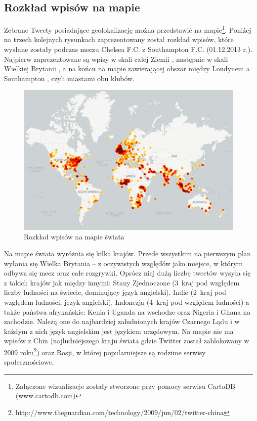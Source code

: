 

\clearpage
\subsection{Rozkład wpisów na mapie}
\label{subsection:rozkladnamapie}
Zebrane Tweety posiadające geolokalizację można przedstawić na
mapie\footnote{Załączone wizualizacje zostały stworzone przy pomocy serwisu
CartoDB (www.cartodb.com)}.
Poniżej na trzech kolejnych rysunkach zaprezentowany został rozkład wpisów,
które wysłane zostały podczas meczu Chelsea F.C. z Southampton F.C.
(01.12.2013 r.). Najpierw zaprezentowane są wpisy w skali całej Ziemii
, następnie w skali Wielkiej Brytanii
, a na końcu na mapie zawierającej obszar między Londynem
a Southampton , czyli miastami obu klubów.

\begin{figure}[ht!]
\centering
\includegraphics[width=140mm]{img/geo-chelsea-southampton-light.png}
\caption{Rozkład wpisów na mapie świata}
\label{image:mapa-swiata}
\end{figure}

Na mapie świata  wyróżnia się kilka krajów. Przede
wszystkim na pierwszym plan wyłania się Wielka Brytania -- z oczywistych względów jako
miejsce, w którym odbywa się mecz oraz całe rozgrywki. Oprócz niej dużą liczbę
tweetów wysyła się z takich krajów jak między innymi:
Stany Zjednoczone (3~kraj pod względem liczby ludności na świecie, dominujący
język angielski), Indie (2~kraj pod względem ludności, język angielski),
Indonezja (4~kraj pod względem ludności) a także państwa afrykańskie: Kenia i Uganda na
wschodze oraz Nigeria i Ghana na zachodzie. Należą one do najbardziej
zaludnionych krajów Czarnego Lądu i w każdym z nich język angielskim jest
językiem urzędowym.
Na mapie nie ma wpisów z Chin (najludniejszego kraju świata gdzie Twitter
został zablokowany w 2009
roku\footnote{http://www.theguardian.com/technology/2009/jun/02/twitter-china})
oraz Rosji, w której popularniejsze są rodzime serwisy społecznościowe.

